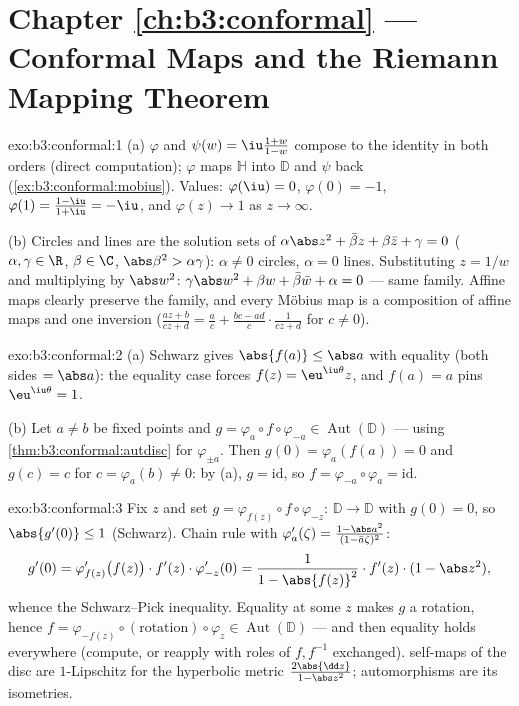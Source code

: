 \section*{Chapter \ref{ch:b3:conformal} --- Conformal Maps and
the Riemann Mapping Theorem}

\begin{solution}{exo:b3:conformal:1}
(a) $\varphi$ and $\psi(w) = \iu\frac{1+w}{1-w}$ compose to
the identity in both orders (direct computation); $\varphi$
maps $\mathbb H$ into $\mathbb D$ and $\psi$ back
(\cref{ex:b3:conformal:mobius}). Values: $\varphi(\iu) = 0$,
$\varphi(0) = -1$, $\varphi(1) = \frac{1 - \iu}{1 + \iu} =
-\iu$, and $\varphi(z) \to 1$ as $z \to \infty$.

(b) Circles and lines are the solution sets of
$\alpha\abs z^2 + \bar\beta z + \beta\bar z + \gamma = 0$
($\alpha, \gamma \in \R$, $\beta \in \C$, $\abs\beta^2 >
\alpha\gamma$): $\alpha \neq 0$ circles, $\alpha = 0$ lines.
Substituting $z = 1/w$ and multiplying by $\abs w^2$:
$\gamma\abs w^2 + \beta w + \bar\beta\bar w + \alpha = 0$ ---
same family. Affine maps clearly preserve the family, and
every M\"obius map is a composition of affine maps and one
inversion ($\frac{az+b}{cz+d} = \frac ac + \frac{bc -
ad}{c}\cdot\frac1{cz + d}$ for $c \neq 0$).
\end{solution}

\begin{solution}{exo:b3:conformal:2}
(a) Schwarz gives $\abs{f(a)} \leq \abs a$ with equality (both
sides $= \abs a$): the equality case forces $f(z) =
\eu^{\iu\theta}z$, and $f(a) = a$ pins $\eu^{\iu\theta} = 1$.

(b) Let $a \neq b$ be fixed points and $g =
\varphi_a\circ f\circ\varphi_{-a} \in
\operatorname{Aut}(\mathbb D)$ --- using
\cref{thm:b3:conformal:autdisc} for $\varphi_{\pm a}$. Then
$g(0) = \varphi_a(f(a)) = 0$ and $g(c) = c$ for $c =
\varphi_a(b) \neq 0$: by (a), $g = \mathrm{id}$, so $f =
\varphi_{-a}\circ\varphi_a = \mathrm{id}$.
\end{solution}

\begin{solution}{exo:b3:conformal:3}
Fix $z$ and set $g = \varphi_{f(z)}\circ f\circ\varphi_{-z}$:
 $\mathbb D \to \mathbb D$ with $g(0) = 0$, so
$\abs{g'(0)} \leq 1$ (Schwarz). Chain rule with
$\varphi_a'(\zeta) = \frac{1 - \abs a^2}{(1 - \bar
a\zeta)^2}$:
\[
g'(0) = \varphi_{f(z)}'\bigl(f(z)\bigr)\cdot f'(z)\cdot
\varphi_{-z}'(0)
= \frac{1}{1 - \abs{f(z)}^2}\cdot f'(z)\cdot(1 - \abs z^2),
\]
whence the Schwarz--Pick inequality. Equality at some $z$
makes $g$ a rotation, hence $f =
\varphi_{-f(z)}\circ(\text{rotation})\circ\varphi_z \in
\operatorname{Aut}(\mathbb D)$ --- and then equality holds
everywhere (compute, or reapply with roles of $f, f^{-1}$
exchanged).  self-maps of the disc are
$1$-Lipschitz for the hyperbolic metric $\frac{2\abs{\dd
z}}{1 - \abs z^2}$; automorphisms are its isometries.
\end{solution}

